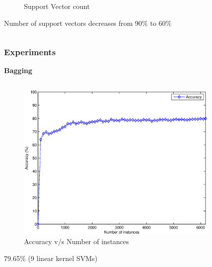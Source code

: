 \documentclass[xcolor=table]{beamer}
\begin{document}
\begin{frame}
\begin{columns}
\begin{column}{0.5\textwidth}
\begin{figure}
                    \caption{Support Vector count}
                \end{figure}
                \begin{center}
                    \small Number of support vectors decreases from 90\% to 60\%
                \end{center}
            \end{column}
        \end{columns}
    \end{frame}
    
    \begin{frame}
        \frametitle{Experiments}
        \begin{center}
            \textbf{Bagging}
        \end{center}
        \begin{columns}
            \begin{column}{0.5\textwidth}
                \begin{figure}
                    \centering
                    \includegraphics[width=\textwidth]{figures/bagging_accuracy.eps}
                    \caption{Accuracy v/s Number of instances}
                \end{figure}
                \begin{center}
                    \small 79.65\% (9 linear kernel SVMs)
                \end{center}
            \end{column}
            \begin{column}{0.5\textwidth}
                \begin{figure}

\end{figure}
\end{column}
\end{columns}
\end{frame}
\end{document}
